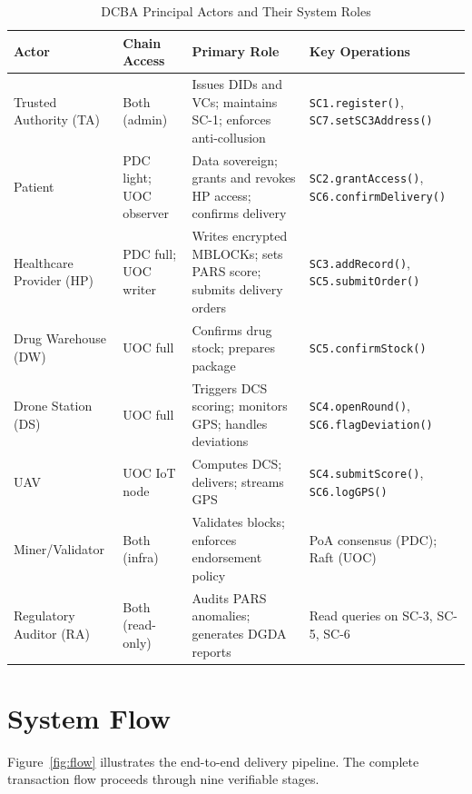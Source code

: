 \documentclass[sigplan,screen,review=false]{acmart}
\begin{document}
\begin{table}[ht]
\centering
\caption{DCBA Principal Actors and Their System Roles}
\label{tab:actors}
\begin{tabular}{@{}p{2.2cm}p{1.8cm}p{4cm}p{4.5cm}@{}}
\toprule
\textbf{Actor} & \textbf{Chain Access} & \textbf{Primary Role} & \textbf{Key Operations} \\
\midrule
Trusted Authority (TA)    & Both (admin)     & Issues DIDs and VCs; maintains SC-1; enforces anti-collusion
                          & \texttt{SC1.register()}, \texttt{SC7.setSC3Address()} \\
Patient                   & PDC light; UOC observer & Data sovereign; grants and revokes HP access; confirms delivery
                          & \texttt{SC2.grantAccess()}, \texttt{SC6.confirmDelivery()} \\
Healthcare Provider (HP)  & PDC full; UOC writer & Writes encrypted MBLOCKs; sets PARS score; submits delivery orders
                          & \texttt{SC3.addRecord()}, \texttt{SC5.submitOrder()} \\
Drug Warehouse (DW)       & UOC full         & Confirms drug stock; prepares package
                          & \texttt{SC5.confirmStock()} \\
Drone Station (DS)        & UOC full         & Triggers DCS scoring; monitors GPS; handles deviations
                          & \texttt{SC4.openRound()}, \texttt{SC6.flagDeviation()} \\
UAV                       & UOC IoT node     & Computes DCS; delivers; streams GPS
                          & \texttt{SC4.submitScore()}, \texttt{SC6.logGPS()} \\
Miner/Validator           & Both (infra)     & Validates blocks; enforces endorsement policy
                          & PoA consensus (PDC); Raft (UOC) \\
Regulatory Auditor (RA)   & Both (read-only) & Audits PARS anomalies; generates DGDA reports
                          & Read queries on SC-3, SC-5, SC-6 \\
\bottomrule
\end{tabular}
\end{table}

\section{System Flow}
\label{sec:flow}

Figure~\ref{fig:flow} illustrates the end-to-end delivery pipeline.
The complete transaction flow proceeds through nine verifiable stages.
\end{document}
